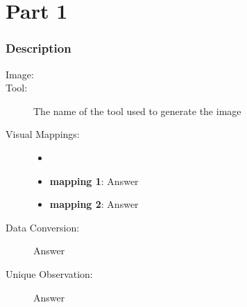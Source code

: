 \hypertarget{part-1-design-1}{%
\section{Part 1}\label{part-1-design-1}}

\centering


\hypertarget{description}{%
\subsubsection{Description}\label{description}}

\begin{description}
	\item[Image:]
	\item[Tool:]
		The name of the tool used to generate the image
	\item[Visual Mappings:]
	\begin{itemize}
		\tightlist
		\item[ ]
	\end{itemize}
	\begin{itemize}
		\tightlist
		\item
		  \textbf{mapping 1}: Answer
	\end{itemize}

	\begin{itemize}
		\tightlist
		\item
		  \textbf{mapping 2}: Answer
	\end{itemize}
	\item[Data Conversion:] Answer
	\item[Unique Observation:]
		Answer
		
\end{description}
